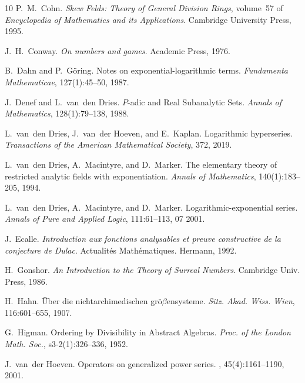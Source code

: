 \documentclass{article}
\newcommand{\tmtextit}[1]{\text{{\itshape{#1}}}}
\theoremstyle{remark}\newtheorem*{convention*}{Convention}
\begin{document}
\begin{thebibliography}{10}
  P.~M.~Cohn. {\newblock}\textit{Skew Felds: Theory
  of General Division Rings},  volume~57  of \textit{Encyclopedia of
  Mathematics and its Applications}. {\newblock}Cambridge University Press,
  1995.{\newblock}
  
  J.~H.~Conway. {\newblock}\textit{On numbers and games}.
  {\newblock}Academic Press, 1976.{\newblock}
  
  B.~Dahn  and  P.~G{\"o}ring. {\newblock}Notes on
  exponential-logarithmic terms. {\newblock}\textit{Fundamenta
  Mathematicae}, 127(1):45--50, 1987.{\newblock}
  
  J.~Denef  and  L.~van~den Dries. {\newblock}$P$-adic
  and Real Subanalytic Sets. {\newblock}\textit{Annals of Mathematics},
  128(1):79--138, 1988.{\newblock}
  
  L.~van~den Dries, J.~van~der Hoeven, and  E.~Kaplan.
  {\newblock}Logarithmic hyperseries. {\newblock}\textit{Transactions of the
  American Mathematical Society}, 372, 2019.{\newblock}
  
  L.~van~den Dries, A.~Macintyre, and  D.~Marker.
  {\newblock}The elementary theory of restricted analytic fields with
  exponentiation. {\newblock}\textit{Annals of Mathematics},
  140(1):183--205, 1994.{\newblock}
  
  L.~van~den Dries, A.~Macintyre, and  D.~Marker.
  {\newblock}Logarithmic-exponential series. {\newblock}\textit{Annals of
  Pure and Applied Logic}, 111:61--113, 07 2001.{\newblock}
  
  J.~Ecalle. {\newblock}\textit{Introduction aux fonctions
  analysables et preuve constructive de la conjecture de Dulac}.
  {\newblock}Actualit{\'e}s Math{\'e}matiques. Hermann, 1992.{\newblock}
  
  H.~Gonshor. {\newblock}\textit{An Introduction to the
  Theory of Surreal Numbers}. {\newblock}Cambridge Univ. Press,
  1986.{\newblock}
  
  H.~Hahn. {\newblock}{\"U}ber die nichtarchimedischen
  gr{\"o}$\beta$ensysteme. {\newblock}\textit{Sitz. Akad. Wiss. Wien},
  116:601--655, 1907.{\newblock}
  
  G.~Higman. {\newblock}Ordering by Divisibility in
  Abstract Algebras. {\newblock}\textit{Proc. of the London Math. Soc.},
  s3-2(1):326--336, 1952.{\newblock}
  
  J.~van~der Hoeven. {\newblock}Operators on
  generalized power series. {\newblock}\tmtextit{Illinois Journal of Math},
  45(4):1161--1190, 2001.{\newblock}
  

\end{thebibliography}
\end{document}
